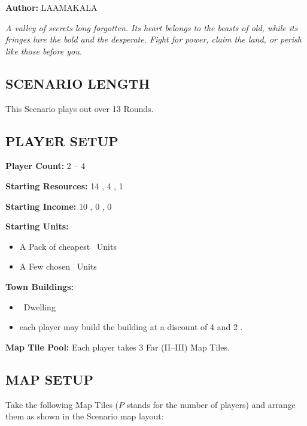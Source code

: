 
\begin{multicols*}{2}

\textbf{Author:} LAAMAKALA

\textit{A valley of secrets long forgotten. Its heart belongs to the beasts of old, while its fringes lure the bold and the desperate. Fight for power, claim the land, or perish like those before you.}

\subsection*{\MakeUppercase{Scenario Length}}
This Scenario plays out over 13 Rounds.

\subsection*{\MakeUppercase{Player Setup}}
\textbf{Player Count:} 2 -- 4

\textbf{Starting Resources:} 14 , 4 , 1 

\textbf{Starting Income:} 10 , 0 , 0 

\textbf{Starting Units:}

\begin{itemize}
  \item A Pack of cheapest \bronze\ Units
  \item A Few chosen \bronze\ Units
\end{itemize}

\textbf{Town Buildings:}
\begin{itemize}
  \item \bronze\ Dwelling
  \item each player may build the  building at a discount of 4  and 2 .
\end{itemize}

\textbf{Map Tile Pool:} Each player takes 3 Far (II–III) Map Tiles.

\subsection*{\MakeUppercase{Map Setup}}
Take the following Map Tiles ($P$ stands for the number of players) and arrange them as shown in the Scenario map layout:


\end{multicols*}
